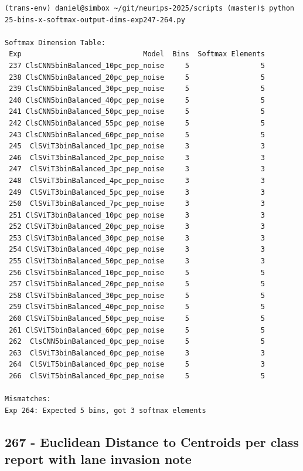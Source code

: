 \begin{verbatim}
(trans-env) daniel@simbox ~/git/neurips-2025/scripts (master)$ python 25-bins-x-softmax-output-dims-exp247-264.py 

Softmax Dimension Table:
 Exp                             Model  Bins  Softmax Elements
 237 ClsCNN5binBalanced_10pc_pep_noise     5                 5
 238 ClsCNN5binBalanced_20pc_pep_noise     5                 5
 239 ClsCNN5binBalanced_30pc_pep_noise     5                 5
 240 ClsCNN5binBalanced_40pc_pep_noise     5                 5
 241 ClsCNN5binBalanced_50pc_pep_noise     5                 5
 242 ClsCNN5binBalanced_55pc_pep_noise     5                 5
 243 ClsCNN5binBalanced_60pc_pep_noise     5                 5
 245  ClSViT3binBalanced_1pc_pep_noise     3                 3
 246  ClSViT3binBalanced_2pc_pep_noise     3                 3
 247  ClSViT3binBalanced_3pc_pep_noise     3                 3
 248  ClSViT3binBalanced_4pc_pep_noise     3                 3
 249  ClSViT3binBalanced_5pc_pep_noise     3                 3
 250  ClSViT3binBalanced_7pc_pep_noise     3                 3
 251 ClSViT3binBalanced_10pc_pep_noise     3                 3
 252 ClSViT3binBalanced_20pc_pep_noise     3                 3
 253 ClSViT3binBalanced_30pc_pep_noise     3                 3
 254 ClSViT3binBalanced_40pc_pep_noise     3                 3
 255 ClSViT3binBalanced_50pc_pep_noise     3                 3
 256 ClSViT5binBalanced_10pc_pep_noise     5                 5
 257 ClSViT5binBalanced_20pc_pep_noise     5                 5
 258 ClSViT5binBalanced_30pc_pep_noise     5                 5
 259 ClSViT5binBalanced_40pc_pep_noise     5                 5
 260 ClSViT5binBalanced_50pc_pep_noise     5                 5
 261 ClSViT5binBalanced_60pc_pep_noise     5                 5
 262  ClsCNN5binBalanced_0pc_pep_noise     5                 5
 263  ClSViT3binBalanced_0pc_pep_noise     3                 3
 264  ClSViT5binBalanced_0pc_pep_noise     5                 3
 266  ClSViT5binBalanced_0pc_pep_noise     5                 5

Mismatches:
Exp 264: Expected 5 bins, got 3 softmax elements
\end{verbatim}

\subsection{267 - Euclidean Distance to Centroids per class report with lane invasion note}
\label{app_res:267}


